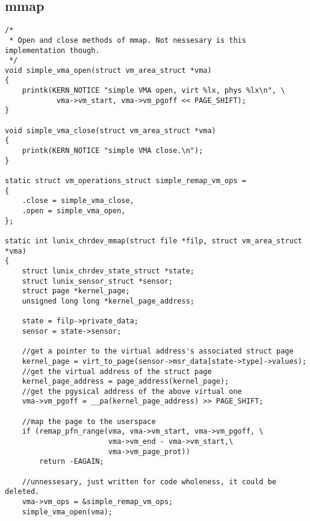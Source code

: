 \documentclass[a4paper]{article}
\begin{document}
\subsection*{mmap}
\label{sec:mmap}
\begin{lstlisting}[style=CStyle]
/*
 * Open and close methods of mmap. Not nessesary is this implementation though.
 */
void simple_vma_open(struct vm_area_struct *vma)
{
    printk(KERN_NOTICE "simple VMA open, virt %lx, phys %lx\n", \
            vma->vm_start, vma->vm_pgoff << PAGE_SHIFT);
}

void simple_vma_close(struct vm_area_struct *vma)
{
    printk(KERN_NOTICE "simple VMA close.\n");
}

static struct vm_operations_struct simple_remap_vm_ops =
{
    .close = simple_vma_close,
    .open = simple_vma_open,
};

static int lunix_chrdev_mmap(struct file *filp, struct vm_area_struct *vma)
{
    struct lunix_chrdev_state_struct *state;
    struct lunix_sensor_struct *sensor;
    struct page *kernel_page;
    unsigned long long *kernel_page_address;

    state = filp->private_data;
    sensor = state->sensor;

    //get a pointer to the virtual address's associated struct page
    kernel_page = virt_to_page(sensor->msr_data[state->type]->values);
    //get the virtual address of the struct page
    kernel_page_address = page_address(kernel_page);
    //get the pgysical address of the above virtual one
    vma->vm_pgoff = __pa(kernel_page_address) >> PAGE_SHIFT;

    //map the page to the userspace
    if (remap_pfn_range(vma, vma->vm_start, vma->vm_pgoff, \
                        vma->vm_end - vma->vm_start,\
                        vma->vm_page_prot))
        return -EAGAIN;

    //unnessesary, just written for code wholeness, it could be deleted.
    vma->vm_ops = &simple_remap_vm_ops;
    simple_vma_open(vma);
\end{lstlisting}
\end{document}
